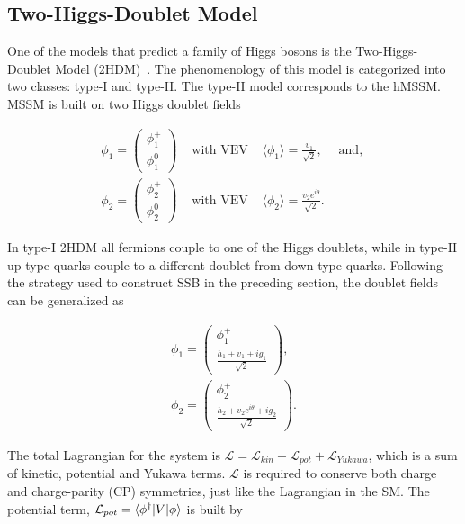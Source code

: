 \subsection{Two-Higgs-Doublet Model}
\par One of the models that predict a family of Higgs bosons is the
Two-Higgs-Doublet Model (2HDM)~\cite{PhysRevD.8.1226}. 
The phenomenology of this model is categorized into two classes: type-I and type-II. The 
type-II model corresponds to the hMSSM. MSSM is built on two Higgs 
doublet fields 

\begin{equation}
\begin{aligned}
\phi_1 = \begin{pmatrix}\phi_1^+ \\ \phi_1^0 \end{pmatrix} &\text{  with VEV } & \langle\phi_1\rangle = \frac{v_1}{\sqrt{2}}, & \text{ and, } \\ 
\phi_2 = \begin{pmatrix}\phi_2^+ \\ \phi_2^0 \end{pmatrix} &\text{  with VEV } & \langle\phi_2\rangle = \frac{v_2e^{i\theta}}{\sqrt{2}}. &  
\end{aligned}
\label{eq:fields}
\end{equation}

In type-I 2HDM all fermions couple to one of the Higgs doublets, while in type-II up-type quarks couple to 
a different doublet from down-type quarks. Following the strategy used to construct 
SSB in the preceding section, the doublet fields can be generalized as 

\begin{equation}
\begin{aligned}
\phi_1 = \begin{pmatrix}\phi_1^+ \\ \frac{h_1 + v_1 + ig_1}{\sqrt{2}} \end{pmatrix}, \\ 
\phi_2 = \begin{pmatrix}\phi_2^+ \\ \frac{h_2 + v_2e^{i\theta} + ig_2}{\sqrt{2}} \end{pmatrix}.
\end{aligned}
\label{eq:fieldsGen}
\end{equation}

The total Lagrangian for the system is  
$\mathcal{L} = \mathcal{L}_{kin} + \mathcal{L}_{pot} + \mathcal{L}_{Yukawa}$, which is a sum 
of kinetic, potential and Yukawa terms.  $\mathcal{L}$ is required to conserve both charge and charge-parity (CP)
symmetries, just like the Lagrangian in the SM. The potential term,  $\mathcal{L}_{pot} = \braket{\phi^\dagger|V|\phi}$ 
is built by 

